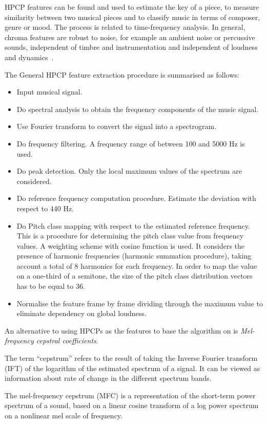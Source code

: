 HPCP features can be found and used to estimate the key of a piece, to measure similarity between two musical pieces and to classify music in terms of composer, genre or mood. The process is related to time-frequency analysis. In general, chroma features are robust to noise, for example an ambient noise or percussive sounds, independent of timbre and instrumentation and independent of loudness and dynamics~\cite{hpcp}.

The General HPCP feature extraction procedure is summarised as follows:
\begin{itemize}
\item Input musical signal.
\item Do spectral analysis to obtain the frequency components of the music signal.
\item Use Fourier transform to convert the signal into a spectrogram.
\item Do frequency filtering. A frequency range of between 100 and 5000 Hz is used.
\item Do peak detection. Only the local maximum values of the spectrum are considered.
\item Do reference frequency computation procedure. Estimate the deviation with respect to 440 Hz.
\item Do Pitch class mapping with respect to the estimated reference frequency. This is a procedure for determining the pitch class value from frequency values. A weighting scheme with cosine function is used. It considers the presence of harmonic frequencies (harmonic summation procedure), taking account a total of 8 harmonics for each frequency. In order to map the value on a one-third of a semitone, the size of the pitch class distribution vectors has to be equal to 36.
\item Normalise the feature frame by frame dividing through the maximum value to eliminate dependency on global loudness.
\end{itemize}

An alternative to using HPCPs as the features to base the algorithm on is \textit{Mel-frequency cepstral coefficients}.

The term ``cepstrum'' refers to the result of taking the Inverse Fourier transform (IFT) of the logarithm of the estimated spectrum of a signal. It can be viewed as information about rate of change in the different spectrum bands.

The mel-frequency cepstrum (MFC) is a representation of the short-term power spectrum of a sound, based on a linear cosine transform of a log power spectrum on a nonlinear mel scale of frequency. 

